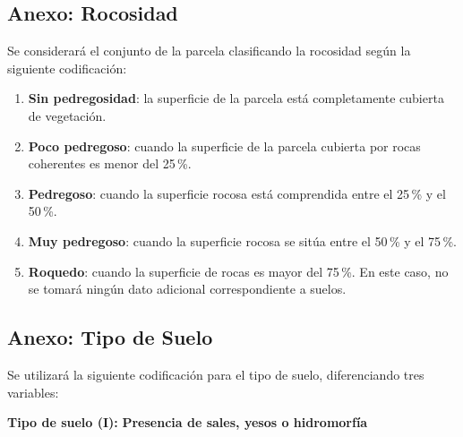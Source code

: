 \subsection{Anexo: Rocosidad}\label{sec:Rocosid}
Se considerará el conjunto de la parcela clasificando la rocosidad según la siguiente codificación:

\begin{enumerate}
    \item \textbf{Sin pedregosidad}: la superficie de la parcela está completamente cubierta de vegetación.
    \item \textbf{Poco pedregoso}: cuando la superficie de la parcela cubierta por rocas coherentes es menor del 25\,\%.
    \item \textbf{Pedregoso}: cuando la superficie rocosa está comprendida entre el 25\,\% y el 50\,\%.
    \item \textbf{Muy pedregoso}: cuando la superficie rocosa se sitúa entre el 50\,\% y el 75\,\%.
    \item \textbf{Roquedo}: cuando la superficie de rocas es mayor del 75\,\%. En este caso, no se tomará ningún dato adicional correspondiente a suelos.
\end{enumerate}





\subsection{Anexo: Tipo de Suelo}\label{sec:TipSuelo}

Se utilizará la siguiente codificación para el tipo de suelo, diferenciando tres variables:

\vspace{1em}
\noindent
\textbf{Tipo de suelo (I):} \textbf{Presencia de sales, yesos o hidromorfía}


